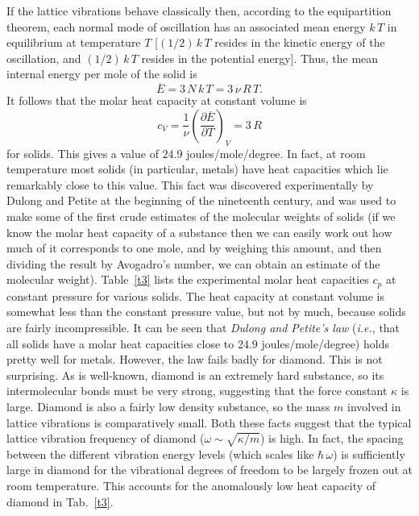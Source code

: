 If the lattice vibrations behave classically then, according to the equipartition theorem,
each normal mode of oscillation has an associated mean energy $k\,T$ in equilibrium at
temperature $T$ [$(1/2)\,k\,T$ resides in the kinetic energy of the oscillation,
and $(1/2)\,k\,T$ resides in the potential energy]. 
Thus, the mean internal energy per mole of the solid is
\begin{equation}
\overline{E} = 3 \,N\,k\,T = 3\,\nu\, R\,T.
\end{equation}
It follows that the molar heat capacity at constant volume is
\begin{equation}
c_V = \frac{1}{\nu}\left(\frac{\partial\overline{E}}{\partial T}\right)_V = 3\,R
\end{equation}
for solids. This gives a value of $24.9$ joules/mole/degree. In fact, at room temperature most
solids (in particular, metals)
 have heat capacities which lie remarkably close to this value. This 
 fact was discovered
experimentally by Dulong and Petite at the beginning of the nineteenth century, and was used to
make some of the first 
crude estimates of the molecular weights of solids (if we know the molar heat capacity 
of a substance
 then we can easily work out how much of  it corresponds to one mole, and
by weighing this amount,   and then dividing the result by Avogadro's number, 
we can obtain an estimate of the molecular weight). Table~\ref{t3} lists the experimental 
molar heat
capacities $c_p$ at constant pressure for various solids. The heat capacity at constant
volume is somewhat less than the  constant pressure value, but not by much,
 because solids 
are fairly incompressible.
It can be seen that {\em Dulong and Petite's law}\/ ({\em i.e.}, that all solids have a molar heat capacities
close to $24.9$ joules/mole/degree) holds pretty well for metals. 
However, the law fails badly for
diamond. This is not surprising. As is well-known,
diamond is an extremely hard substance, so its intermolecular bonds must be very strong, suggesting
that the force constant $\kappa$ is large.
Diamond is also a fairly low density substance, so the mass $m$ involved in
lattice vibrations is comparatively small. Both these facts suggest that the typical lattice vibration
frequency of diamond  ($\omega \sim \sqrt{\kappa/m}$) is high. In fact, the spacing between 
the different vibration energy
levels (which scales like $\hbar \,\omega$) is sufficiently large in diamond for the vibrational
degrees of freedom
 to be largely frozen out at room temperature. This accounts for  the anomalously low
heat capacity of diamond in Tab.~\ref{t3}.

